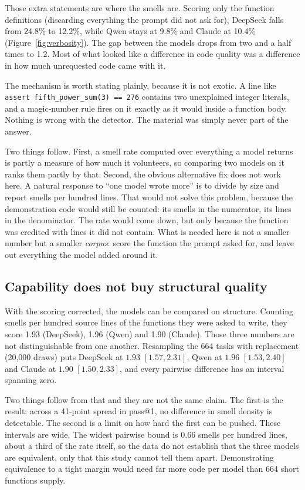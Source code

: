 \documentclass[10pt,a4paper,twocolumn]{article}
\begin{document}
Those extra statements are where the smells are. Scoring only the function
definitions (discarding everything the prompt did not ask for), DeepSeek falls
from 24.8\% to 12.2\%, while Qwen stays at 9.8\% and Claude at 10.4\%
(Figure~\ref{fig:verbosity}). The gap between the models drops from two and a
half times to 1.2. Most of what looked like a difference in code quality was a
difference in how much unrequested code came with it.

The mechanism is worth stating plainly, because it is not exotic. A line like
\texttt{assert fifth\_power\_sum(3) == 276} contains two unexplained integer
literals, and a magic-number rule fires on it exactly as it would inside a
function body. Nothing is wrong with the detector. The material was simply never
part of the answer.

Two things follow. First, a smell rate computed over everything a model returns
is partly a measure of how much it volunteers, so comparing two models on it
ranks them partly by that. Second, the obvious alternative fix does not work
here. A natural response to ``one model wrote more'' is to divide by size and
report smells per hundred lines. That would not solve this problem, because the
demonstration code would still be counted: its smells in the numerator, its
lines in the denominator. The rate would come down, but only because the
function was credited with lines it did not contain. What is needed here is not
a smaller number but a smaller \emph{corpus}: score the function the prompt
asked for, and leave out everything the model added around it.

\subsection{Capability does not buy structural quality}
\label{sec:capability}


With the scoring corrected, the models can be compared on structure. Counting
smells per hundred source lines of the functions they were asked to write, they
score 1.93 (DeepSeek), 1.96 (Qwen) and 1.90 (Claude). Those three numbers are
not distinguishable from one another. Resampling the 664 tasks with replacement
(20{,}000 draws) puts DeepSeek at $1.93$ $[1.57, 2.31]$, Qwen at $1.96$ $[1.53, 2.40]$ and Claude at $1.90$
$[1.50, 2.33]$, and every pairwise difference has an interval spanning zero.

Two things follow from that and they are not the same claim. The first is the
result: across a 41-point spread in pass@1, no difference in smell density is
detectable. The second is a limit on how hard the first can be pushed. These
intervals are wide. The widest pairwise bound is $0.66$ smells per hundred lines,
about a third of the rate itself, so the data do not establish that the three
models are equivalent, only that this study cannot tell them apart.
Demonstrating equivalence to a tight margin would need far more code per model
than 664 short functions supply.
\end{document}
